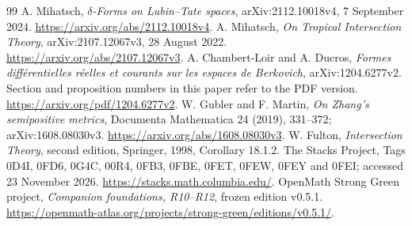 \documentclass[11pt,a4paper]{article}
\theoremstyle{definition}
\theoremstyle{remark}
\begin{document}
\begin{thebibliography}{99}
 A. Mihatsch, \emph{$\delta$-Forms on Lubin--Tate spaces},
arXiv:2112.10018v4, 7 September 2024.
\url{https://arxiv.org/abs/2112.10018v4}.
 A. Mihatsch, \emph{On Tropical Intersection Theory},
arXiv:2107.12067v3, 28 August 2022.
\url{https://arxiv.org/abs/2107.12067v3}.
 A. Chambert-Loir and A. Ducros,
\emph{Formes diff\'erentielles r\'eelles et courants sur les espaces de Berkovich},
arXiv:1204.6277v2. Section and proposition numbers in this paper refer
to the PDF version. \url{https://arxiv.org/pdf/1204.6277v2}.
 W. Gubler and F. Martin, \emph{On Zhang's semipositive metrics},
Documenta Mathematica 24 (2019), 331--372; arXiv:1608.08030v3.
\url{https://arxiv.org/abs/1608.08030v3}.
 W. Fulton, \emph{Intersection Theory}, second edition,
Springer, 1998, Corollary 18.1.2.
 The Stacks Project, Tags 0D4I, 0FD6, 0G4C, 00R4,
0FB3, 0FBE, 0FET, 0FEW, 0FEY and 0FEI; accessed 23 November 2026.
\url{https://stacks.math.columbia.edu/}.
 OpenMath Strong Green project,
\emph{Companion foundations, R10--R12}, frozen edition v0.5.1.
\url{https://openmath-atlas.org/projects/strong-green/editions/v0.5.1/}.
\end{thebibliography}
\end{document}
